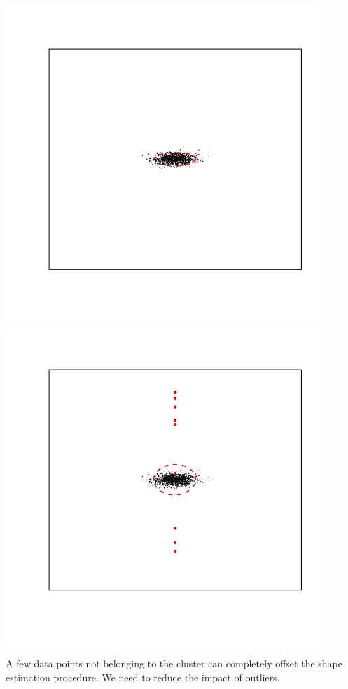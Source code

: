 \documentclass[landscape,footrule]{foils}
\begin{document}
\begin{center}
\hspace*{-1cm}
\includegraphics[width=12cm]{corrupted-gmm-1}\hspace*{-2cm}
\includegraphics[width=12cm]{corrupted-gmm-2}
\end{center}
\vspace*{-2cm}
A few data points not belonging to the cluster can completely offset the shape estimation procedure. We need to reduce the impact of  outliers.\vspace*{-1cm}
\end{document}
